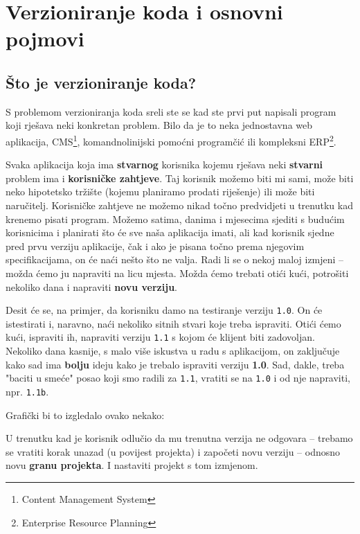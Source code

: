 \chapter*{Verzioniranje koda i osnovni pojmovi}

\section*{Što je verzioniranje koda?}

S problemom verzioniranja koda sreli ste se kad ste prvi put napisali program koji rješava neki konkretan problem. 
Bilo da je to neka jednostavna web aplikacija, CMS\footnote{Content Management System}, komandnolinijski pomoćni programčić ili kompleksni ERP\footnote{Enterprise Resource Planning}.

Svaka aplikacija koja ima \textbf{stvarnog} korisnika kojemu rješava neki \textbf{stvarni} problem ima i \textbf{korisničke zahtjeve}.
Taj korisnik možemo biti mi sami, može biti neko hipotetsko tržište (kojemu planiramo prodati riješenje) ili može biti naručitelj.
Korisničke zahtjeve ne možemo nikad točno predvidjeti u trenutku kad krenemo pisati program.
Možemo satima, danima i mjesecima sjediti s budućim korisnicima i planirati što će sve naša aplikacija imati, ali kad korisnik sjedne pred prvu verziju aplikacije, čak i ako je pisana točno prema njegovim specifikacijama, on će naći nešto što ne valja. 
Radi li se o nekoj maloj izmjeni -- možda ćemo ju napraviti na licu mjesta.
Možda ćemo trebati otići kući, potrošiti nekoliko dana i napraviti \textbf{novu verziju}.

Desit će se, na primjer, da korisniku damo na testiranje verziju \texttt{1.0}.
On će istestirati i, naravno, naći nekoliko sitnih stvari koje treba ispraviti.
Otići ćemo kući, ispraviti ih, napraviti verziju \texttt{1.1} s kojom će klijent biti zadovoljan.
Nekoliko dana kasnije, s malo više iskustva u radu s aplikacijom, on zaključuje kako sad ima \textbf{bolju} ideju kako je trebalo ispraviti verziju \textbf{1.0}.
Sad, dakle, treba "baciti u smeće" posao koji smo radili za \texttt{1.1}, vratiti se na \texttt{1.0} i od nje napraviti, npr. \texttt{1.1b}.

Grafički bi to izgledalo ovako nekako:



U trenutku kad je korisnik odlučio da mu trenutna verzija ne odgovara -- trebamo se vratiti korak unazad (u povijest projekta) i započeti novu verziju -- odnosno novu \textbf{granu projekta}.
I nastaviti projekt s tom izmjenom.


